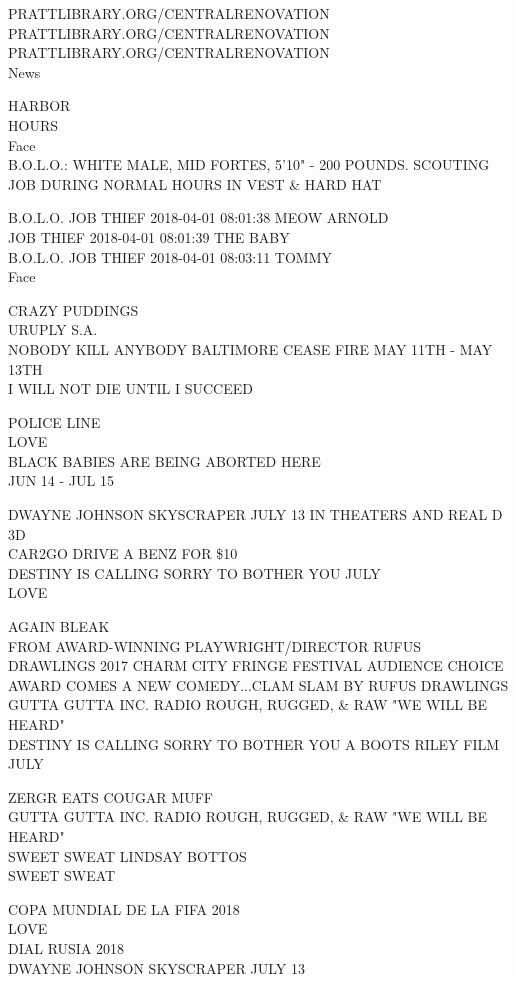 \documentclass[10pt,letterpaper]{article}
\begin{document}
PRATTLIBRARY.ORG/CENTRALRENOVATION\\
PRATTLIBRARY.ORG/CENTRALRENOVATION\\
PRATTLIBRARY.ORG/CENTRALRENOVATION\\
News

HARBOR\\
HOURS\\
Face\\
B.O.L.O.: WHITE MALE, MID FORTES, 5'10" {-} 200 POUNDS.  SCOUTING JOB DURING NORMAL HOURS IN VEST \& HARD HAT

B.O.L.O. JOB THIEF 2018{-}04{-}01 08:01:38 MEOW ARNOLD\\
JOB THIEF 2018{-}04{-}01 08:01:39 THE BABY\\
B.O.L.O. JOB THIEF 2018{-}04{-}01 08:03:11 TOMMY\\
Face

CRAZY PUDDINGS\\
URUPLY S.A.\\
NOBODY KILL ANYBODY BALTIMORE CEASE FIRE MAY 11TH {-} MAY 13TH\\
I WILL NOT DIE UNTIL I SUCCEED

POLICE LINE\\
LOVE\\
BLACK BABIES ARE BEING ABORTED HERE\\
JUN 14 {-} JUL 15

DWAYNE JOHNSON SKYSCRAPER JULY 13 IN THEATERS AND REAL D 3D\\
CAR2GO DRIVE A BENZ FOR \$10\\
DESTINY IS CALLING SORRY TO BOTHER YOU JULY\\
LOVE

AGAIN BLEAK\\
FROM AWARD{-}WINNING PLAYWRIGHT/DIRECTOR RUFUS DRAWLINGS 2017 CHARM CITY FRINGE FESTIVAL AUDIENCE CHOICE AWARD COMES A NEW COMEDY...CLAM SLAM BY RUFUS DRAWLINGS\\
GUTTA GUTTA INC. RADIO ROUGH, RUGGED, \& RAW "WE WILL BE HEARD"\\
DESTINY IS CALLING SORRY TO BOTHER YOU A BOOTS RILEY FILM JULY

ZERGR EATS COUGAR MUFF\\
GUTTA GUTTA INC. RADIO ROUGH, RUGGED, \& RAW "WE WILL BE HEARD"\\
SWEET SWEAT LINDSAY BOTTOS\\
SWEET SWEAT

COPA MUNDIAL DE LA FIFA 2018\\
LOVE\\
DIAL RUSIA 2018\\
DWAYNE JOHNSON SKYSCRAPER JULY 13
\end{document}
